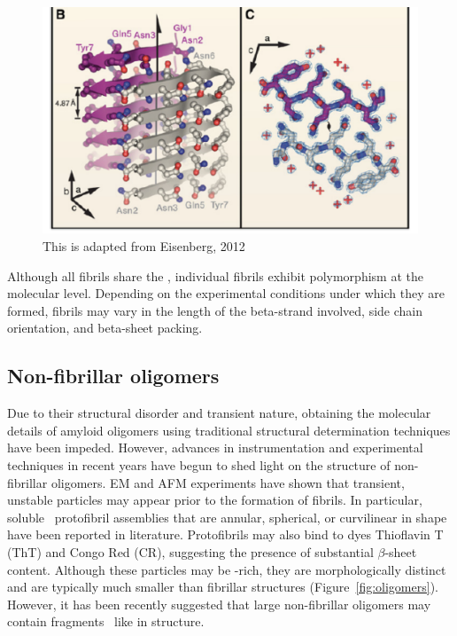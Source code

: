 \begin{figure}
  \centering
  \includegraphics[width=6in]{figures/introduction/fibril_xray_model.pdf}
  \caption[Characteristic cross-$\beta$ spacings from X-ray fibre diffraction studies of amyloid fibrils]{This is adapted from Eisenberg, 2012}
  \label{fig:fibril_xray_model}
\end{figure}

Although all fibrils share the \crossbs, individual fibrils exhibit polymorphism at the molecular level. Depending on the experimental conditions under which they are formed, fibrils may vary in the length of the beta-strand involved, side chain orientation, and beta-sheet packing.\cite{Kodali:2007cz} %


\subsection{Non-fibrillar oligomers}
Due to their structural disorder and transient nature, obtaining the molecular details of amyloid oligomers using traditional structural determination techniques have been impeded. However, advances in instrumentation and experimental techniques in recent years have begun to shed light on the structure of non-fibrillar oligomers. EM and AFM experiments have shown that transient, unstable particles may appear prior to the formation of fibrils. In particular, soluble \abeta\ protofibril assemblies that are annular, spherical, or curvilinear in shape have been reported in literature.\cite{Haass:2007db} Protofibrils may also bind to dyes Thioflavin T (ThT) and Congo Red (CR), suggesting the presence of substantial $\beta$-sheet content.\cite{Walsh:2007fu,Haass:2007db,Kodali:2007cz} Although these particles may be \bsheet-rich, they are morphologically distinct and are typically much smaller than fibrillar structures (Figure~\ref{fig:oligomers}).\cite{Walsh:2009p1235} However, it has been recently suggested that large non-fibrillar oligomers may contain fragments \crossb\ like in structure.\cite{Walsh:2010p4761,Stroud:2012dp,Chimon:2007du}  

